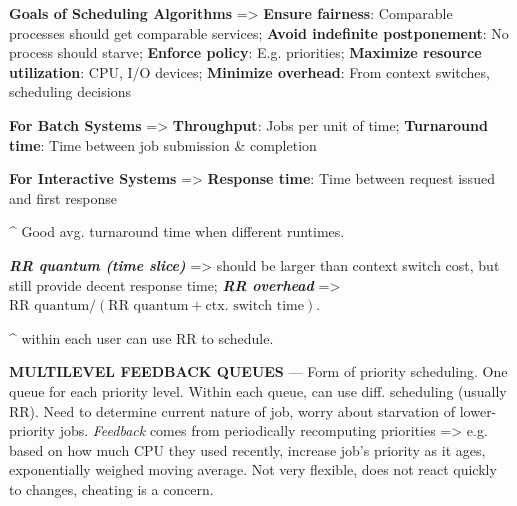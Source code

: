 
\textcolor{cornellred}{\textbf{Goals of Scheduling Algorithms}} => 
\textbf{Ensure fairness}: Comparable processes should get comparable services;
\textbf{Avoid indefinite postponement}: No process should starve;
\textbf{Enforce policy}: E.g. priorities;
\textbf{Maximize resource utilization}: CPU, I/O devices;
\textbf{Minimize overhead}: From context switches, scheduling decisions

\textcolor{cornellred}{\textbf{For Batch Systems}} => 
\textbf{Throughput}: Jobs per unit of time;
\textbf{Turnaround time}: Time between job submission \& completion


\textcolor{cornellred}{\textbf{For Interactive Systems}} => 
\textbf{Response time}: Time between request issued and first response


\hSep

\^{} Good avg. turnaround time when different runtimes.

\textit{\textbf{RR quantum (time slice)}} => should be larger than context switch cost,
but still provide decent response time;
\textit{\textbf{RR overhead}} =>
\(\textrm{RR quantum} / (\textrm{RR quantum} + \textrm{ctx. switch time})\).

\^{} within each user can use RR to schedule.


\textbf{MULTILEVEL FEEDBACK QUEUES} — Form of priority
scheduling. One queue for each priority level. Within each
queue, can use diff. scheduling (usually RR). Need to
determine current nature of job, worry about starvation of
lower-priority jobs. \textit{Feedback} comes from periodically
recomputing priorities => e.g. based on how much CPU they
used recently, increase job's priority as it ages, exponentially weighed
moving average. Not very flexible, does not react quickly to changes, cheating is a concern.


\hSep